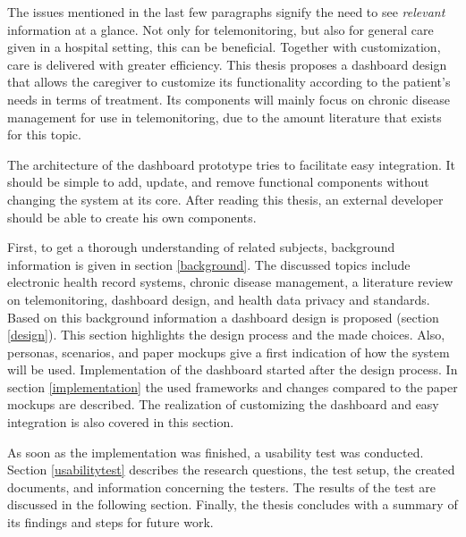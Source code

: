 The issues mentioned in the last few paragraphs signify the need to see \emph{relevant} information at a glance. Not only for telemonitoring, but also for general care given in a hospital setting, this can be beneficial. Together with customization, care is delivered with greater efficiency. This thesis proposes a dashboard design that allows the caregiver to customize its functionality according to the patient's needs in terms of treatment. Its components will mainly focus on chronic disease management for use in telemonitoring, due to the amount literature that exists for this topic. 

The architecture of the dashboard prototype tries to facilitate easy integration. It should be simple to add, update, and remove functional components without changing the system at its core. After reading this thesis, an external developer should be able to create his own components. 

First, to get a thorough understanding of related subjects, background information is given in section \ref{background}. The discussed topics include electronic health record systems, chronic disease management, a literature review on telemonitoring, dashboard design, and health data privacy and standards. Based on this background information a dashboard design is proposed (section \ref{design}). This section highlights the design process and the made choices. Also, personas, scenarios, and paper mockups give a first indication of how the system will be used. Implementation of the dashboard started after the design process. In section \ref{implementation} the used frameworks and changes compared to the paper mockups are described. The realization of customizing the dashboard and easy integration is also covered in this section.

As soon as the implementation was finished, a usability test was conducted. Section \ref{usabilitytest} describes the research questions, the test setup, the created documents, and information concerning the testers. The results of the test are discussed in the following section. Finally, the thesis concludes with a summary of its findings and steps for future work.